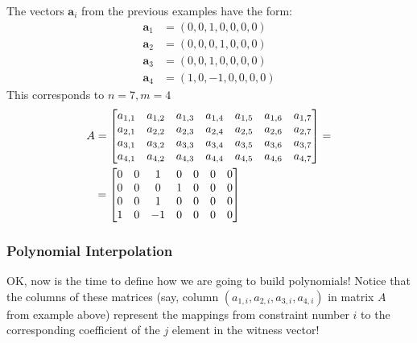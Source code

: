 \documentclass[../lecture-notes.tex]{subfiles}
\begin{document}
\begin{example}
    The vectors $\mathbf{a}_i$ from the previous examples have the form:
    \begin{align*}
        \mathbf{a}_1 &= (0, 0, 1, 0, 0, 0, 0) \\
        \mathbf{a}_2 &= (0, 0, 0, 1, 0, 0, 0) \\
        \mathbf{a}_3 &= (0, 0, 1, 0, 0, 0, 0) \\
        \mathbf{a}_4 &= (1, 0, -1, 0, 0, 0, 0)
    \end{align*}
    This corresponds to $n = 7, m = 4$
    \begin{equation*}
        \begin{aligned}            
        &A = \begin{bmatrix}
            a_{1,1} & a_{1,2} & a_{1,3} & a_{1,4} & a_{1,5} & a_{1,6} & a_{1,7} \\
            a_{2,1} & a_{2,2} & a_{2,3} & a_{2,4} & a_{2,5} & a_{2,6} & a_{2,7} \\
            a_{3,1} & a_{3,2} & a_{3,3} & a_{3,4} & a_{3,5} & a_{3,6} & a_{3,7} \\
            a_{4,1} & a_{4,2} & a_{4,3} & a_{4,4} & a_{4,5} & a_{4,6} & a_{4,7}
        \end{bmatrix} = \\ &\text{\;\;\,} = \begin{bmatrix}
            0 & 0 & 1 & 0 & 0 & 0 & 0 \\
            0 & 0 & 0 & 1 & 0 & 0 & 0 \\
            0 & 0 & 1 & 0 & 0 & 0 & 0 \\
            1 & 0 & -1 & 0 & 0 & 0 & 0 
        \end{bmatrix}
    \end{aligned}
\end{equation*}
\end{example}

\subsubsection{Polynomial Interpolation}

OK, now is the time to define how we are going to build polynomials! Notice that the columns of these matrices (say, column $(a_{1,i},a_{2,i},a_{3,i},a_{4,i})$ in matrix $A$ from example above) represent the mappings from constraint number $i$ to the corresponding
coefficient of the $j$ element in the witness vector!
\end{document}
